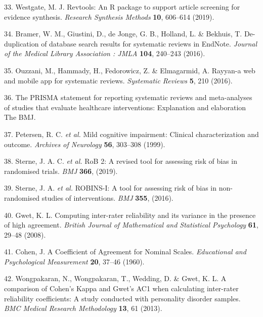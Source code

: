 \documentclass[a4paper, twoside]{templates/ociamthesis}
\begin{document}
\leavevmode\hypertarget{ref-westgate2019revtools}{}%
33. Westgate, M. J. Revtools: An R package to support article screening for evidence synthesis. \emph{Research Synthesis Methods} \textbf{10}, 606--614 (2019).

\leavevmode\hypertarget{ref-bramer2016}{}%
34. Bramer, W. M., Giustini, D., de Jonge, G. B., Holland, L. \& Bekhuis, T. De-duplication of database search results for systematic reviews in EndNote. \emph{Journal of the Medical Library Association : JMLA} \textbf{104}, 240--243 (2016).

\leavevmode\hypertarget{ref-ouzzani2016}{}%
35. Ouzzani, M., Hammady, H., Fedorowicz, Z. \& Elmagarmid, A. Rayyan-a web and mobile app for systematic reviews. \emph{Systematic Reviews} \textbf{5}, 210 (2016).

\leavevmode\hypertarget{ref-zotero-766}{}%
36. The PRISMA statement for reporting systematic reviews and meta-analyses of studies that evaluate healthcare interventions: Explanation and elaboration \textbar{} The BMJ.

\leavevmode\hypertarget{ref-petersen1999}{}%
37. Petersen, R. C. \emph{et al.} Mild cognitive impairment: Clinical characterization and outcome. \emph{Archives of Neurology} \textbf{56}, 303--308 (1999).

\leavevmode\hypertarget{ref-sterne2019}{}%
38. Sterne, J. A. C. \emph{et al.} RoB 2: A revised tool for assessing risk of bias in randomised trials. \emph{BMJ} \textbf{366}, (2019).

\leavevmode\hypertarget{ref-sterne2016}{}%
39. Sterne, J. A. \emph{et al.} ROBINS-I: A tool for assessing risk of bias in non-randomised studies of interventions. \emph{BMJ} \textbf{355}, (2016).

\leavevmode\hypertarget{ref-gwet2008}{}%
40. Gwet, K. L. Computing inter-rater reliability and its variance in the presence of high agreement. \emph{British Journal of Mathematical and Statistical Psychology} \textbf{61}, 29--48 (2008).

\leavevmode\hypertarget{ref-cohen1960}{}%
41. Cohen, J. A Coefficient of Agreement for Nominal Scales. \emph{Educational and Psychological Measurement} \textbf{20}, 37--46 (1960).

\leavevmode\hypertarget{ref-wongpakaran2013}{}%
42. Wongpakaran, N., Wongpakaran, T., Wedding, D. \& Gwet, K. L. A comparison of Cohen's Kappa and Gwet's AC1 when calculating inter-rater reliability coefficients: A study conducted with personality disorder samples. \emph{BMC Medical Research Methodology} \textbf{13}, 61 (2013).
\end{document}
